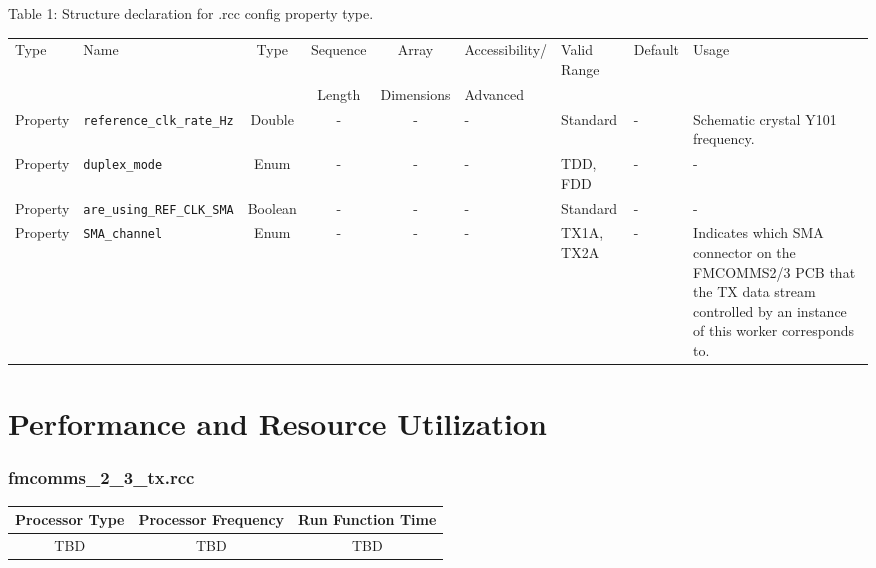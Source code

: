 \begin{landscape}
	Table \hypertarget{tab1}{1}: Structure declaration for \comp{}.rcc config property type.
	\begin{scriptsize}
		\begin{longtable}{|p{1.8cm}|p{3.6cm}|c|c|c|p{2cm}|p{3.7cm}|p{3.7cm}|p{2.5cm}|}
			\hline
			\rowcolor{blue}
			Type         & Name                                & Type & Sequence & Array      & Accessibility/ & Valid Range  & Default & Usage                                                                                                                                                                                                                       \\
			\rowcolor{blue}
			             &                                     &      & Length   & Dimensions & Advanced       &              &         &                                                                                                                                                                                                                             \\
			\hline
			Property     & \verb+reference_clk_rate_Hz+                   & Double & -        & -          & - & Standard & - & Schematic crystal Y101 frequency. \\
			\hline
			Property     & \verb+duplex_mode+                             & Enum   & -        & -          & - & TDD, FDD & - & - \\
			\hline
			Property     & \verb+are_using_REF_CLK_SMA+                             & Boolean& -        & -          & - & Standard & - & - \\
			\hline
			Property     & \verb+SMA_channel+                                       & Enum   & -        & -          & - & TX1A, TX2A & - & Indicates which SMA connector on the FMCOMMS2/3 PCB that the TX data stream controlled by an instance of this worker corresponds to. \\
			\hline
		\end{longtable}
	\end{scriptsize}

\end{landscape}

\section*{Performance and Resource Utilization}
\subsubsection*{fmcomms\_2\_3\_tx.rcc}
\begin{scriptsize}
	\begin{tabular}{|c|c|c|}
		\hline
		\rowcolor{blue}
		Processor Type & Processor Frequency & Run Function Time \\
		\hline
		TBD            & TBD                 & TBD               \\
		\hline
	\end{tabular}
\end{scriptsize}


